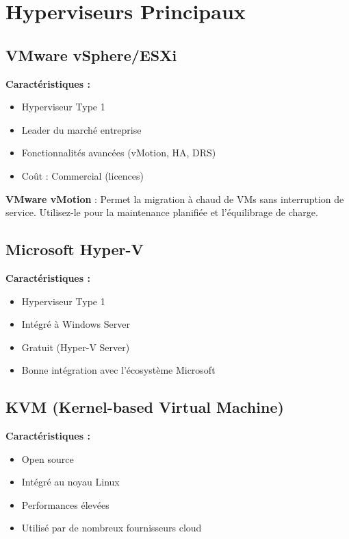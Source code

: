 \documentclass[11pt,a4paper]{article}
\begin{document}
\section{Hyperviseurs Principaux}

\subsection{VMware vSphere/ESXi}

\textbf{Caractéristiques :}
\begin{itemize}
    \item Hyperviseur Type 1
    \item Leader du marché entreprise
    \item Fonctionnalités avancées (vMotion, HA, DRS)
    \item Coût : Commercial (licences)
\end{itemize}

\begin{tipbox}
\textbf{VMware vMotion} : Permet la migration à chaud de VMs sans interruption de service. Utilisez-le pour la maintenance planifiée et l'équilibrage de charge.
\end{tipbox}

\subsection{Microsoft Hyper-V}

\textbf{Caractéristiques :}
\begin{itemize}
    \item Hyperviseur Type 1
    \item Intégré à Windows Server
    \item Gratuit (Hyper-V Server)
    \item Bonne intégration avec l'écosystème Microsoft
\end{itemize}

\subsection{KVM (Kernel-based Virtual Machine)}

\textbf{Caractéristiques :}
\begin{itemize}
    \item Open source
    \item Intégré au noyau Linux
    \item Performances élevées
    \item Utilisé par de nombreux fournisseurs cloud
\end{itemize}
\end{document}
